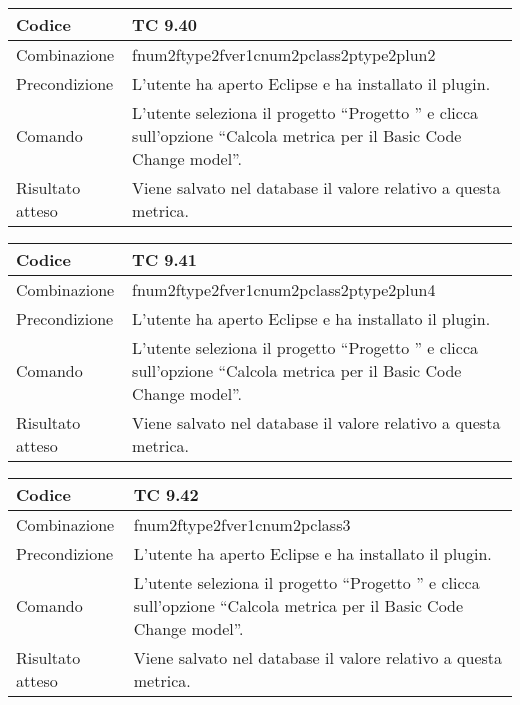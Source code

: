 \begin{table}[ht]
\begin{tabular}{|p{3cm}|p{9cm}|}
\hline
\cellcolor{lightgray}Codice				& TC 9.40								\\
\hline
\cellcolor{lightgray}Combinazione		& fnum2ftype2fver1cnum2pclass2ptype2plun2									\\
\hline
\cellcolor{lightgray}Precondizione		& L'utente ha aperto Eclipse e ha installato il plugin.		\\
\hline
\cellcolor{lightgray}Comando			& L'utente seleziona il progetto ``Progetto ''  e clicca sull'opzione ``Calcola metrica per il Basic Code Change model''.	\\
\hline
\cellcolor{lightgray}Risultato atteso	& Viene salvato nel database il valore relativo a questa metrica.\\
\hline
\end{tabular}
\end{table}

\begin{table}[ht]
\begin{tabular}{|p{3cm}|p{9cm}|}
\hline
\cellcolor{lightgray}Codice				& TC 9.41								\\
\hline
\cellcolor{lightgray}Combinazione		& fnum2ftype2fver1cnum2pclass2ptype2plun4									\\
\hline
\cellcolor{lightgray}Precondizione		& L'utente ha aperto Eclipse e ha installato il plugin.		\\
\hline
\cellcolor{lightgray}Comando			& L'utente seleziona il progetto ``Progetto ''  e clicca sull'opzione ``Calcola metrica per il Basic Code Change model''.	\\
\hline
\cellcolor{lightgray}Risultato atteso	& Viene salvato nel database il valore relativo a questa metrica.\\
\hline
\end{tabular}
\end{table}

\begin{table}[ht]
\begin{tabular}{|p{3cm}|p{9cm}|}
\hline
\cellcolor{lightgray}Codice				& TC 9.42								\\
\hline
\cellcolor{lightgray}Combinazione		& fnum2ftype2fver1cnum2pclass3									\\
\hline
\cellcolor{lightgray}Precondizione		& L'utente ha aperto Eclipse e ha installato il plugin.		\\
\hline
\cellcolor{lightgray}Comando			& L'utente seleziona il progetto ``Progetto ''  e clicca sull'opzione ``Calcola metrica per il Basic Code Change model''.	\\
\hline
\cellcolor{lightgray}Risultato atteso	& Viene salvato nel database il valore relativo a questa metrica.\\
\hline
\end{tabular}
\end{table}

